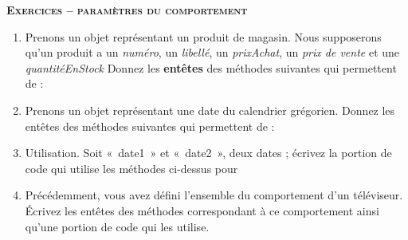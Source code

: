 
{\sffamily\bfseries\scshape
Exercices – paramètres du comportement}

\begin{enumerate}
	\item 
		Prenons un objet représentant un produit de magasin. 
		Nous supposerons qu'un produit a un \textit{numéro}, un 
		\textit{libellé}, un \textit{prixAchat}, un
		\textit{prix de vente} et une \textit{quantitéEnStock}
		Donnez les \textbf{entêtes} des méthodes suivantes qui permettent de
		:

			
	\item 
		Prenons un objet représentant une date du calendrier grégorien. 
		Donnez les entêtes des méthodes suivantes qui permettent de
		:

		
	\item 
		Utilisation. Soit «~date1~» et «~date2~», deux dates ; écrivez la
		portion de code qui utilise les méthodes ci-dessus pour
		
	
	\item 
		Précédemment, vous avez défini l'ensemble du
		comportement d'un téléviseur. Écrivez les entêtes des
		méthodes correspondant à ce comportement ainsi qu'une
		portion de code qui les utilise.
\end{enumerate}

